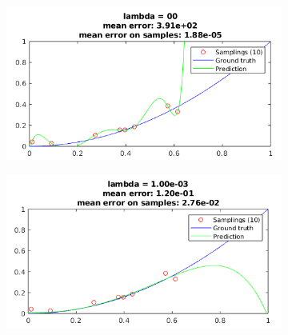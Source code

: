 \documentclass[12pt]{article}
\begin{document}
\begin{figure}[H]
  \centering
  \begin{subfigure}{0.45\textwidth}
    \includegraphics[width=\textwidth]{plots/regression_lambda/lambda_eq_0.png}
  \end{subfigure}
  \begin{subfigure}{0.45\textwidth}
    \includegraphics[width=\textwidth]{plots/regression_lambda/lambda_eq_10-3.png}
  \end{subfigure}
\end{figure}
\end{document}
